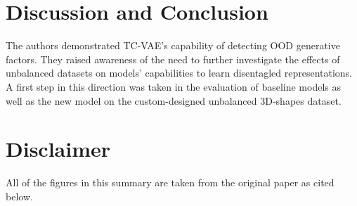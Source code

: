 \documentclass[twoside,11pt]{article}
\begin{document}
\section{Discussion and Conclusion}
The authors demonstrated TC-VAE's capability of detecting OOD generative factors. They raised awareness of the need to further investigate the effects of unbalanced datasets on models' capabilities to learn disentagled representations.
A first step in this direction was taken in the evaluation of baseline models as well as the new model on the custom-designed unbalanced 3D-shapes dataset.




\section{Disclaimer}
All of the figures in this summary are taken from the original paper as cited below.


\newpage



\nocite{*}

\end{document}
